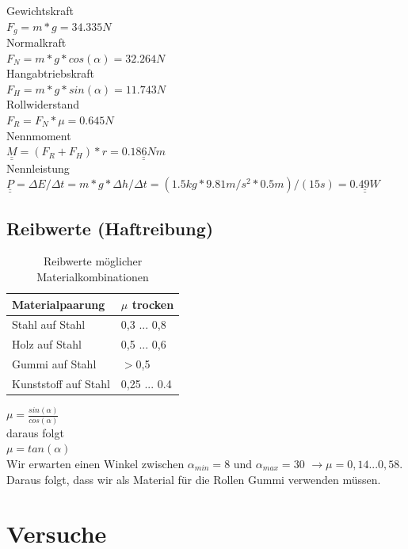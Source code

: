 \documentclass[a4paper]{report}
\begin{document}
\noindent
Gewichtskraft\\
$F_{g}=m*g=34.335 N$	\\
Normalkraft	\\
$F_{N}=m*g*cos(\alpha)=32.264 N$	\\
Hangabtriebskraft	\\
$F_{H}=m*g*sin(\alpha)=11.743 N$	\\
Rollwiderstand	\\
$F_{R}=F_{N}*\mu=0.645 N$	\\
Nennmoment	\\
$\underline{\underline{M}}=(F_{R}+F_{H})*r=\underline{\underline{0.186 Nm}}$	\\
Nennleistung	\\
$\underline{\underline{P}}=\Delta E/\Delta t=m*g*\Delta h/\Delta t=(1.5kg*9.81m/s^2*0.5m)/(15s)=\underline{\underline{0.49W}}$\\

\subsection{Reibwerte (Haftreibung)}
\label{ssec:ReibWer}

\begin{table}[h!]
	\centering
	\begin{tabular}{|p{}|p{}|}
		\hline
		\textbf{Materialpaarung} & \textbf{$\mu$ trocken}\\
		\hline
		Stahl auf Stahl & 0,3 ... 0,8 \\
		\hline
		Holz auf Stahl & 0,5 ... 0,6\\
		\hline
		Gummi auf Stahl & $>$0,5 \\
		\hline
		Kunststoff auf Stahl & 0,25 ... 0.4\\
		\hline
	\end{tabular}
	\caption{Reibwerte möglicher Materialkombinationen \parencite{Wittel2015}}
	\label{tab:Reibwerte}
\end{table}

\noindent
$\mu=\frac{sin(\alpha)}{cos(\alpha)}$\\

\noindent
daraus folgt\\
$\mu=tan(\alpha)$\\
Wir erwarten einen Winkel zwischen $\alpha_{min}=8$ und $\alpha_{max}=30$ $ \rightarrow \mu = 0,14 ... 0,58$. Daraus folgt, dass wir als Material für die Rollen Gummi verwenden müssen.

\section{Versuche}
\label{sec:Versuche}
\end{document}
